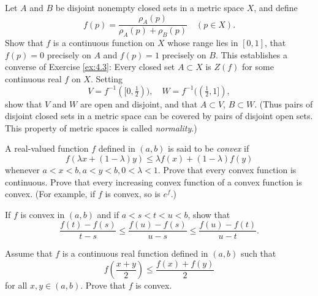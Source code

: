 \begin{myexercise}
    \label{ex:4.22}
    Let $A$ and $B$ be disjoint nonempty closed sets in a metric space $X$, and define
    \begin{equation*}
        f(p) = \frac{\rho_A(p)}{\rho_A(p) + \rho_B(p)}
        \quad 
        (p \in X).
    \end{equation*}
    Show that $f$ is a continuous function on $X$ whose range lies in $[0, 1]$, that $f(p) = 0$ precisely on $A$ and $f(p) = 1$ precisely on $B$. 
    This establishes a converse of Exercise \ref{ex:4.3}: 
    Every closed set $A \subset X$ is $Z(f)$ for some continuous real $f$ on $X$. 
    Setting 
    \begin{equation*}
        V = f^{-1}([0, \tfrac{1}{2})), 
        \quad 
        W = f^{-1}((\tfrac{1}{2}, 1]),
    \end{equation*}
    show that $V$ and $W$ are open and disjoint, 
    and that $A \subset V$, $B \subset W$. 
    (Thus pairs of disjoint closed sets in a metric space can be covered by pairs of disjoint open sets. 
    This property of metric spaces is called \emph{normality}.)
\end{myexercise}


\begin{myexercise}
    \label{ex:4.23}
    A real-valued function $f$ defined in $(a, b)$ is said to be \emph{convex} if
    \begin{equation*}
        f(\lambda x + (1-\lambda)y) \leq
        \lambda f(x) + (1-\lambda)f(y)
    \end{equation*}
    whenever $a < x < b, a < y < b, 0 < \lambda < 1$. 
    Prove that every convex function is continuous. 
    Prove that every increasing convex function of a convex function is convex. 
    (For example, if $f$ is convex, so is $e^f$.)

    If $f$ is convex in $(a, b)$ and if $a< s < t < u < b$, show that
    \begin{equation*}
        \frac{f(t) - f(s)}{t - s} \leq
        \frac{f(u) - f(s)}{u - s} \leq
        \frac{f(u) - f(t)}{u - t}  .
    \end{equation*}
\end{myexercise}


\begin{myexercise}
    \label{ex:4.24}
    Assume that $f$ is a continuous real function defined in $(a, b)$ such that
    \begin{equation*}
        f\left( \frac{x+y}{2} \right) \leq 
        \frac{f(x) + f(y)}{2}
    \end{equation*}
    for all $x, y \in  (a, b)$. 
    Prove that $f$ is convex.
\end{myexercise}


